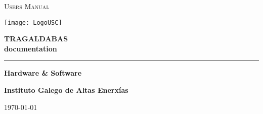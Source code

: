 
\begin{titlepage}
	\par
	\centering
	\vspace{1cm}
	
\begin{minipage}[b]{0.5\linewidth}
\centering
	{\scshape\LARGE Users Manual}
	\vspace{40pt}
\end{minipage}
\begin{minipage}[b]{0.4\linewidth}
\texttt{[image: LogoUSC]}
\end{minipage}

	\vspace{1.5cm}
	{\huge\bfseries TRAGALDABAS\\documentation\par}
	\vspace{0.25cm}
	
	\noindent\rule{\textwidth}{1pt}
	
	\vspace{0.25cm}
	{\huge\bfseries Hardware \& Software\par}
	
	\vspace{2cm}
	
	{\large\bfseries Instituto Galego de Altas Enerxías\par}
	\vspace{1cm}


	\vfill


	{\large \today\par}
\end{titlepage}
